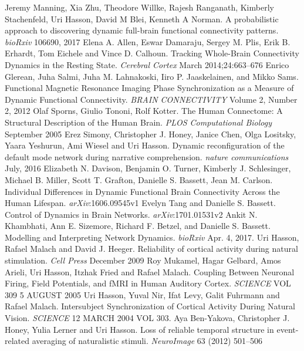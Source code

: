 \documentclass[11pt]{article}
\begin{document}
\newpage
\begin{thebibliography}{1}
 Jeremy Manning, Xia Zhu, Theodore Willke, Rajesh Ranganath, Kimberly Stachenfeld, Uri Hasson, David M Blei, Kenneth A Norman. A probabilistic approach to discovering dynamic full-brain functional connectivity patterns. \textit{bioRxiv} 106690, 2017
 Elena A. Allen, Eswar Damaraju, Sergey M. Plis, Erik B. Erhardt, Tom Eichele and Vince D. Calhoun. Tracking Whole-Brain Connectivity Dynamics in the Resting State. \textit{Cerebral Cortex} March 2014;24:663–676
 Enrico Glerean, Juha Salmi, Juha M. Lahnakoski, Iiro P. Jaaskelainen, and Mikko Sams. Functional Magnetic Resonance Imaging Phase Synchronization as a Measure of Dynamic Functional Connectivity. \textit{BRAIN CONNECTIVITY} Volume 2, Number 2, 2012
 Olaf Sporns, Giulio Tononi, Rolf Kotter. The Human Connectome: A Structural Description of the Human Brain. \textit{PLOS Computational Biology} September 2005
 Erez Simony, Christopher J. Honey, Janice Chen, Olga Lositsky, Yaara Yeshurun, Ami Wiesel and Uri Hasson. Dynamic reconfiguration of the default mode network during narrative comprehension. \textit{nature communications} July, 2016
 Elizabeth N. Davison, Benjamin O. Turner, Kimberly J. Schlesinger, Michael B. Miller, Scott T. Grafton, Danielle S. Bassett, Jean M. Carlson. Individual Differences in Dynamic Functional Brain Connectivity Across the Human Lifespan. \textit{arXiv}:1606.09545v1
 Evelyn Tang and Danielle S. Bassett. Control of Dynamics in Brain Networks. \textit{arXiv}:1701.01531v2
 Ankit N. Khambhati, Ann E. Sizemore, Richard F. Betzel, and Danielle S. Bassett. Modelling and Interpreting Network Dynamics. \textit{bioRxiv} Apr. 4, 2017.
 Uri Hasson, Rafael Malach and David J. Heeger. Reliability of cortical activity during natural stimulation. \textit{Cell Press} December 2009
 Roy Mukamel, Hagar Gelbard, Amos Arieli, Uri Hasson, Itzhak Fried and Rafael Malach. Coupling Between Neuronal Firing, Field Potentials, and fMRI in Human Auditory Cortex. \textit{SCIENCE} VOL 309 5 AUGUST 2005
 Uri Hasson, Yuval Nir, Ifat Levy, Galit Fuhrmann and Rafael Malach. Intersubject Synchronization of Cortical Activity During Natural Vision. \textit{SCIENCE} 12 MARCH 2004 VOL 303.
 Aya Ben-Yakova, Christopher J. Honey, Yulia Lerner and Uri Hasson. Loss of reliable temporal structure in event-related averaging of naturalistic stimuli. \textit{NeuroImage} 63 (2012) 501–506

\end{thebibliography}
\end{document}
